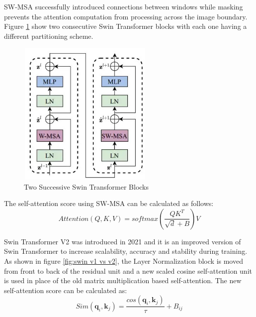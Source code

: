 SW-MSA successfully introduced connections between windows while masking prevents the attention computation from processing across the image boundary. Figure \ref{fig:2swins} show two consecutive Swin Transformer blocks with each one having a different partitioning scheme.
\FloatBarrier
\begin{figure}[ht]
\includegraphics[width=6.5cm, height=7cm]{images/swin-architecture.jpg}
\centering
\caption{Two Successive Swin Transformer Blocks \protect\cite{swin-v1}}
\label{fig:2swins}
\end{figure}

The self-attention score using SW-MSA can be calculated as follows:
\begin{equation}
    Attention(Q,K,V) = softmax(\frac{QK^T}{\sqrt{d}+B})V
\end{equation}

Swin Transformer V2 \cite{swin-v2} was introduced in 2021 and it is an improved version of Swin Transformer to increase scalability, accuracy and stability during training. As shown in figure \ref{fig:swin v1 vs v2}, the Layer Normalization block is moved from front to back of the residual unit and a new scaled cosine self-attention unit is used in place of the old matrix multiplication based self-attention. The new self-attention score can be calculated as:
\begin{equation}
    Sim(\mathbf{q}_i,\mathbf{k}_j) = \frac{cos(\mathbf{q}_i,\mathbf{k}_j)}{\tau} + B_{ij}
\end{equation}

